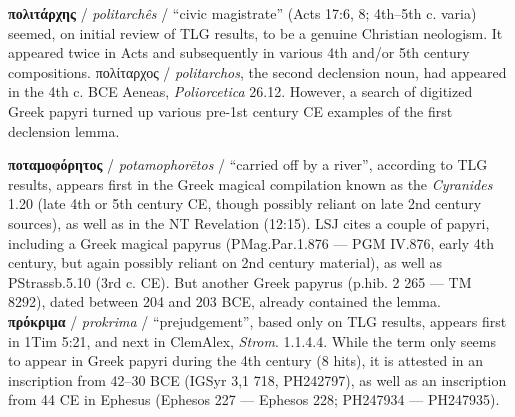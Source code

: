 \noindent{}\textbf{πολιτάρχης} / \textit{politarchês} / “civic magistrate” (Acts 17:6, 8; 4th--5th c. varia) %
seemed, on initial review of TLG results, to be a genuine Christian neologism. %
It appeared twice in Acts and subsequently in various 4th and/or 5th century compositions. %
πολίταρχος / \textit{politarchos}, the second declension noun, had appeared in the 4th c. BCE Aeneas, %
\textit{Poliorcetica} 26.12. %
However, a search of digitized Greek papyri turned up various pre-1st century CE examples %
of the first declension lemma. \clearpage %

\noindent{}\textbf{ποταμοφόρητος} / \textit{potamophorētos} / “carried off by a river”, %
according to TLG results, appears first in the Greek magical compilation known %
as the \textit{Cyranides} 1.20 (late 4th or 5th century CE, though possibly reliant on late 2nd century sources), %
as well as in the NT Revelation (12:15). %
LSJ cites a couple of papyri, including a Greek magical papyrus (PMag.Par.1.876 — PGM IV.876, early 4th century, %
but again possibly reliant on 2nd century material), %
as well as PStrassb.5.10 (3rd c. CE). %
But another Greek papyrus (p.hib. 2 265 — TM 8292), dated between 204 and 203 BCE, %
already contained the lemma. \\[1mm]

\noindent{}\textbf{πρόκριμα} / \textit{prokrima} / “prejudgement”, %
based only on TLG results, %
appears first in 1Tim 5:21, and next in ClemAlex, \textit{Strom}. 1.1.4.4. %
While the term only seems to appear in Greek papyri during the 4th century (8 hits), %
it is attested in an inscription from 42--30 BCE (IGSyr 3,1 718, PH242797), %
as well as an inscription from 44 CE in Ephesus (Ephesos 227 — Ephesos 228; PH247934 — PH247935). \\[1mm]

